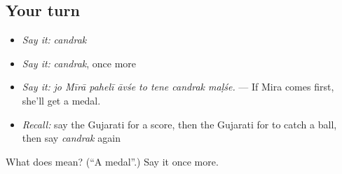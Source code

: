 \subsection*{Your turn}
\begin{itemize}
\raggedright
  \item \emph{Say it:} \emph{candrak}
  \item \emph{Say it:} \emph{candrak}, once more
  \item \emph{Say it:} \emph{jo Mīrā pahelī āvśe to tene candrak maḷśe.} — If Mira comes first, she'll get a medal.
  \item \emph{Recall:} say the Gujarati for a score, then the Gujarati for to catch a ball, then say \emph{candrak} again
\end{itemize}

\begin{tcolorbox}[breakable,colback=teal!4,colframe=teal!35!black,title={Before you move on}]
What does  mean? (\textquotedblleft{}A medal\textquotedblright{}.) Say it once more.
\end{tcolorbox}
